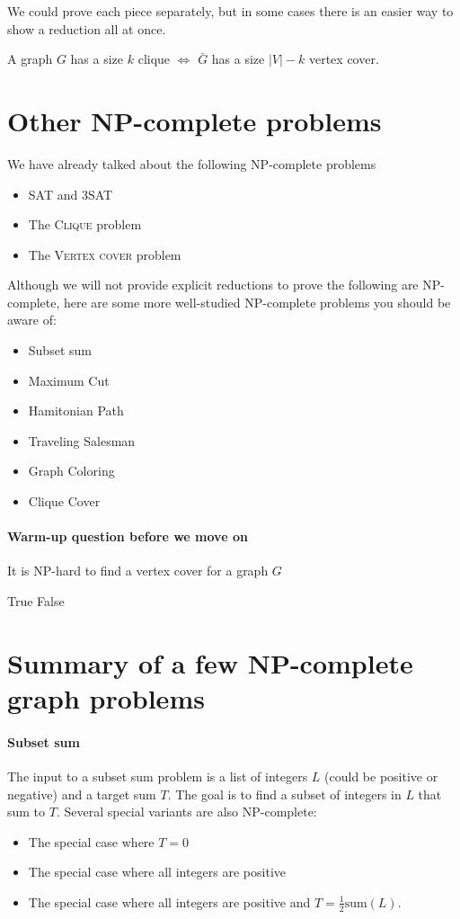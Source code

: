 \documentclass[11  pt]{article}
\begin{document}
We could prove each piece separately, but in some cases there is an easier way to show a reduction all at once.
\begin{theorem}
	A graph $G$ has a size $k$ clique $\iff$ $\bar{G}$ has a size $|V| - k$ vertex cover.
\end{theorem}


\newpage


	\section{Other NP-complete problems}
We have already talked about the following NP-complete problems
\begin{itemize}
	\item SAT and 3SAT
	\item The \textsc{Clique} problem
	\item The \textsc{Vertex cover} problem
\end{itemize}

Although we will not provide explicit reductions to prove the following are NP-complete, here are some more well-studied NP-complete problems you should be aware of:
\begin{itemize}
	\item Subset sum
	\item Maximum Cut
	\item Hamitonian Path
	\item Traveling Salesman
	\item Graph Coloring
	\item Clique Cover
\end{itemize}

\paragraph{Warm-up question before we move on}
\begin{Qu}
	It is NP-hard to find a vertex cover for a graph $G$
	\begin{itemize}
		\aitem True
		\bitem False
	\end{itemize}
\end{Qu}

\newpage
\section{Summary of a few NP-complete graph problems}
\paragraph{Subset sum}
The input to a subset sum problem is a list of integers $L$ (could be positive or negative) and a target sum $T$. The goal is to find a subset of integers in $L$ that sum to $T$. Several special variants are also NP-complete:
\begin{itemize}
	\item The special case where $T = 0$
	\item The special case where all integers are positive
	\item The special case where all integers are positive and $T = \frac{1}{2} \text{sum}(L)$.
\end{itemize}
\end{document}
